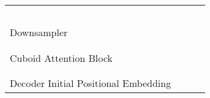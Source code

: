 \documentclass{article}
\begin{document}
\begin{table}[!tb]
\begin{center}
{\begin{tabular}{l|l|c|c}
                                                        &   &                       &               \\
                                                        &             &                       &               \\
                                                        &       &                       &               \\
                                                        &   &                       &               \\
                                                        &             &                       &               \\\hline
    \multirow{3}{*}{Downsampler}                        &      &  & \\
                                                        &       &                       &              \\
                                                        &          &                       & \\\hline  
    \multirow{9}{*}{Cuboid Attention Block }  &       &                       &              \\
                                                        &   &                       &              \\
                                                        &             &                       &              \\
                                                        &       &                       &              \\
                                                        &   &                       &              \\
                                                        &             &                       &              \\
                                                        &       &                       &              \\
                                                        &   &                       &              \\
                                                        &             &                       &              \\\hline
    \midrule
    Decoder Initial Positional Embedding                &        &                       &              \\\hline

\end{tabular}}
\end{center}
\end{table}
\end{document}
